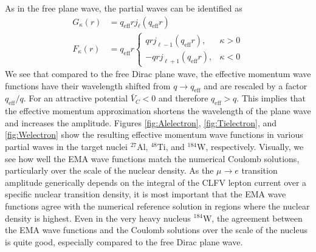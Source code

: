 \documentclass{book}[12pt]
\begin{document}
As in the free plane wave, the partial waves can be identified as
\begin{equation}
\begin{split}
G_{\kappa}(r)&=q_\mathrm{eff}rj_{\ell}(q_\mathrm{eff}r)\\
F_{\kappa}(r)&=q_\mathrm{eff}r\left\{\begin{array}{cc}
qrj_{\ell-1}(q_\mathrm{eff}r), & \kappa>0\\
-qrj_{\ell+1}(q_\mathrm{eff}r), &\kappa < 0
\end{array}\right.
\end{split}
\label{eq:ema_bessel}
\end{equation}
We see that compared to the free Dirac plane wave, the effective momentum wave functions have their wavelength shifted from $q\rightarrow q_\mathrm{eff}$ and are rescaled by a factor $q_\mathrm{eff}/q$. For an attractive potential $\bar{V}_C < 0$ and therefore $q_\mathrm{eff}>q$. This implies that the effective momentum approximation shortens the wavelength of the plane wave and increases the amplitude. Figures \ref{fig:Alelectron}, \ref{fig:Tielectron}, and \ref{fig:Welectron} show the resulting effective momentum wave functions in various partial waves in the target nuclei $^{27}$Al, $^{48}$Ti, and $^{184}$W, respectively. Visually, we see how well the EMA wave functions match the numerical Coulomb solutions, particularly over the scale of the nuclear density. As the $\mu\rightarrow e$ transition amplitude generically depends on the integral of the CLFV lepton current over a specific nuclear transition density, it is most important that the EMA wave functions agree with the numerical reference solution in regions where the nuclear density is highest. Even in the very heavy nucleus $^{184}$W, the agreement between the EMA wave functions and the Coulomb solutions over the scale of the nucleus is quite good, especially compared to the free Dirac plane wave.
\end{document}
